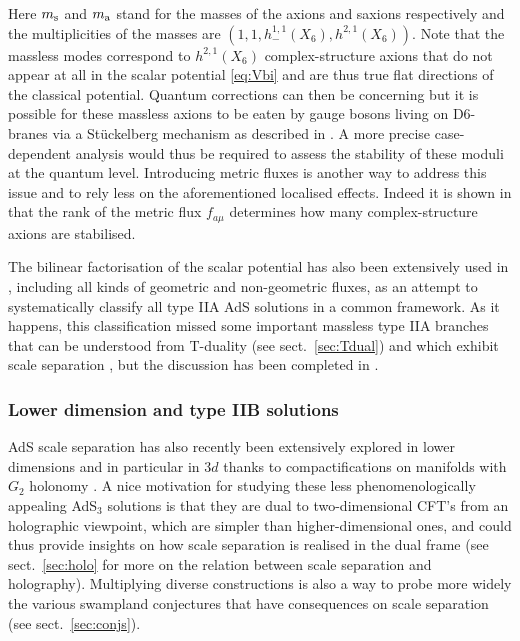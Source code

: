 \documentclass[11pt, a4paper]{article}
\begin{document}
%
Here $m_{\rm s}$ and $m_{\rm a}$ stand for the masses of the axions and saxions respectively and the multiplicities of the masses are $(1,1,h^{1,1}_-(X_6),h^{2,1}(X_6))$. Note that the massless modes correspond to $h^{2,1}(X_6)$ complex-structure axions that do not appear at all in the scalar potential \eqref{eq:Vbi} and are thus true flat directions of the classical potential. Quantum corrections can then be concerning but it is possible for these massless axions to be eaten by gauge bosons living on D6-branes via a Stückelberg mechanism as described in \cite{Camara:2005dc}. A more precise case-dependent analysis would thus be required to assess the stability of these moduli at the quantum level. Introducing metric fluxes is another way to address this issue and to rely less on the aforementioned localised effects. Indeed it is shown in \cite{Marchesano:2020uqz} that the rank of the metric flux $f_{a\mu}$ determines how many complex-structure axions are stabilised.

The bilinear factorisation of the scalar potential has also been extensively used in \cite{Marchesano:2020uqz}, including all kinds of geometric and non-geometric fluxes, as an attempt to systematically classify all type IIA AdS solutions in a common framework. As it happens, this classification missed some important massless type IIA branches that can be understood from T-duality (see sect.~\ref{sec:Tdual}) and which exhibit scale separation \cite{Cribiori:2021djm}, but the discussion has been completed in \cite{Carrasco:2023hta}.

\subsubsection{Lower dimension and type IIB solutions}
\label{sec:3d}

AdS scale separation has also recently been extensively explored in lower dimensions and in particular in 3$d$ thanks to compactifications on manifolds with $G_2$ holonomy \cite{Farakos:2020phe,VanHemelryck:2022ynr,Farakos:2023nms,Farakos:2023wps}. A nice motivation for studying these less phenomenologically appealing AdS$_3$ solutions is that they are dual to two-dimensional CFT's from an holographic viewpoint, which are simpler than higher-dimensional ones, and could thus provide insights on how scale separation is realised in the dual frame (see sect.~\ref{sec:holo} for more on the relation between scale separation and holography). Multiplying diverse constructions is also a way to probe more widely the various swampland conjectures that have consequences on scale separation (see sect.~\ref{sec:conjs}).
\end{document}
